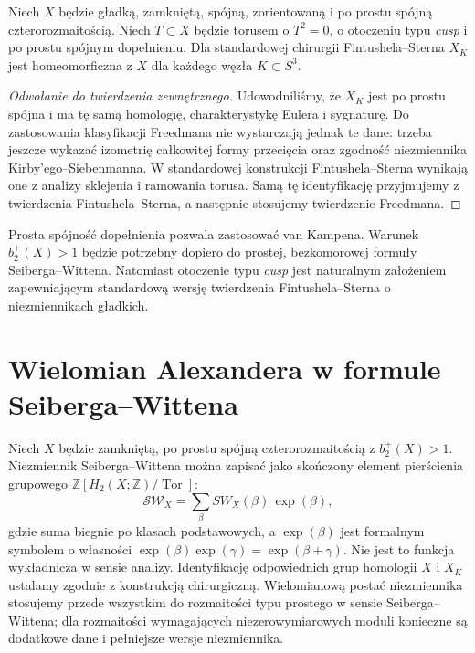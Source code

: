 \begin{twierdzenie}
\label{thm:tg-ks-homeo}
Niech $X$ będzie gładką, zamkniętą, spójną,
zorientowaną i po prostu spójną czterorozmaitością.
Niech $T\subset X$ będzie torusem o $T^2=0$,
o otoczeniu typu \emph{cusp} i po prostu spójnym
dopełnieniu. Dla standardowej chirurgii
Fintushela--Sterna $X_K$ jest homeomorficzna z $X$
dla każdego węzła $K\subset S^3$.
\end{twierdzenie}

\begin{proof}[Odwołanie do twierdzenia zewnętrznego]
Udowodniliśmy, że $X_K$ jest po prostu spójna i ma
tę samą homologię, charakterystykę Eulera i sygnaturę.
Do zastosowania klasyfikacji Freedmana nie wystarczają
jednak te dane: trzeba jeszcze wykazać izometrię
całkowitej formy przecięcia oraz zgodność niezmiennika
Kirby'ego--Siebenmanna. W standardowej konstrukcji
Fintushela--Sterna wynikają one z analizy sklejenia
i ramowania torusa. Samą tę identyfikację przyjmujemy
z twierdzenia Fintushela--Sterna, a następnie
stosujemy twierdzenie Freedmana.
\end{proof}

\begin{uwaga}
Prosta spójność dopełnienia pozwala zastosować
van Kampena. Warunek $b_2^+(X)>1$ będzie potrzebny
dopiero do prostej, bezkomorowej formuły Seiberga--Wittena.
Natomiast otoczenie typu \emph{cusp} jest naturalnym
założeniem zapewniającym standardową wersję twierdzenia
Fintushela--Sterna o niezmiennikach gładkich.
\end{uwaga}

\section{Wielomian Alexandera w formule Seiberga--Wittena}
\label{sec:tg-ks-sw}

Niech $X$ będzie zamkniętą, po prostu spójną czterorozmaitością
z $b_2^+(X)>1$. Niezmiennik Seiberga--Wittena można zapisać
jako skończony element pierścienia grupowego
$\mathbb Z[H_2(X;\mathbb Z)/\operatorname{Tor}]$:
\[
\mathcal{SW}_X=\sum_{\beta}SW_X(\beta)\,\exp(\beta),
\]
gdzie suma biegnie po klasach podstawowych, a
$\exp(\beta)$ jest formalnym symbolem o własności
$\exp(\beta)\exp(\gamma)=\exp(\beta+\gamma)$.
Nie jest to funkcja wykładnicza w sensie analizy.
Identyfikację odpowiednich grup homologii $X$
i $X_K$ ustalamy zgodnie z konstrukcją chirurgiczną.
Wielomianową postać niezmiennika stosujemy przede wszystkim
do rozmaitości typu prostego w sensie Seiberga--Wittena;
dla rozmaitości wymagających niezerowymiarowych moduli
konieczne są dodatkowe dane i pełniejsze wersje niezmiennika.

